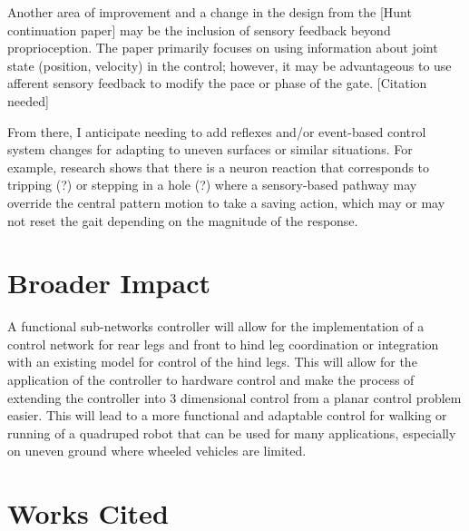 \documentclass[12pt, letterpaper, oneside, notitlepage, onecolumn]{article}
\begin{document}
Another area of improvement and a change in the design from the [Hunt continuation paper] may be the inclusion of sensory feedback beyond proprioception. The paper primarily focuses on using information about joint state (position, velocity) in the control; however, it may be advantageous to use afferent sensory feedback to modify the pace or phase of the gate. [Citation needed]

From there, I anticipate needing to add reflexes and/or event-based control system changes for adapting to uneven surfaces or similar situations. For example, research shows that there is a neuron reaction that corresponds to tripping (?) or stepping in a hole (?) where a sensory-based pathway may override the central pattern motion to take a saving action, which may or may not reset the gait depending on the magnitude of the response.

\section{Broader Impact}

A functional sub-networks controller will allow for the implementation of a control network for rear legs and front to hind leg coordination or integration with an existing model for control of the hind legs. This will allow for the application of the controller to hardware control and make the process of extending the controller into 3 dimensional control from a planar control problem easier. This will lead to a more functional and adaptable control for walking or running of a quadruped robot that can be used for many applications, especially on uneven ground where wheeled vehicles are limited.


\newpage

\section{Works Cited}

\end{document}
